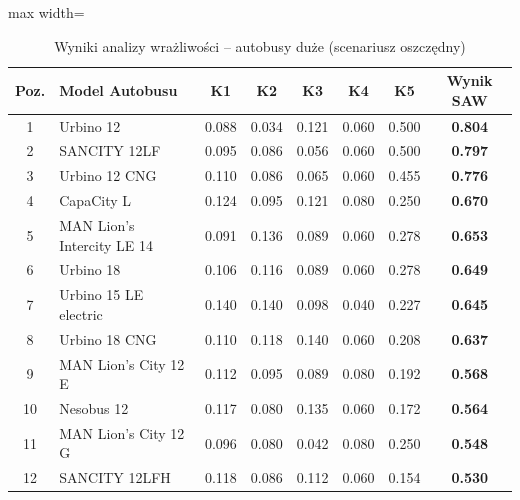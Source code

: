 \begin{table}[H]
    \centering
    \caption{Wyniki analizy wrażliwości -- autobusy duże (scenariusz oszczędny)}
    \vspace{0.2cm}
    \begin{adjustbox}{max width=\textwidth}
    \begin{tabular}{|c|l|c|c|c|c|c|c|}
        \hline
        \textbf{Poz.} & \textbf{Model Autobusu} & \textbf{K1} & \textbf{K2} & \textbf{K3} & \textbf{K4} & \textbf{K5} & \textbf{Wynik SAW} \\ \hline
        1 & Urbino 12              & 0.088 & 0.034 & 0.121 & 0.060 & 0.500 & \textbf{0.804} \\ \hline
        2 & SANCITY 12LF           & 0.095 & 0.086 & 0.056 & 0.060 & 0.500 & \textbf{0.797} \\ \hline
        3 & Urbino 12 CNG          & 0.110 & 0.086 & 0.065 & 0.060 & 0.455 & \textbf{0.776} \\ \hline
        4 & CapaCity L             & 0.124 & 0.095 & 0.121 & 0.080 & 0.250 & \textbf{0.670} \\ \hline
        5 & MAN Lion's Intercity LE 14 & 0.091 & 0.136 & 0.089 & 0.060 & 0.278 & \textbf{0.653} \\ \hline
        6 & Urbino 18              & 0.106 & 0.116 & 0.089 & 0.060 & 0.278 & \textbf{0.649} \\ \hline
        7 & Urbino 15 LE electric  & 0.140 & 0.140 & 0.098 & 0.040 & 0.227 & \textbf{0.645} \\ \hline
        8 & Urbino 18 CNG          & 0.110 & 0.118 & 0.140 & 0.060 & 0.208 & \textbf{0.637} \\ \hline
        9 & MAN Lion's City 12 E   & 0.112 & 0.095 & 0.089 & 0.080 & 0.192 & \textbf{0.568} \\ \hline
        10 & Nesobus 12            & 0.117 & 0.080 & 0.135 & 0.060 & 0.172 & \textbf{0.564} \\ \hline
        11 & MAN Lion's City 12 G  & 0.096 & 0.080 & 0.042 & 0.080 & 0.250 & \textbf{0.548} \\ \hline
        12 & SANCITY 12LFH         & 0.118 & 0.086 & 0.112 & 0.060 & 0.154 & \textbf{0.530} \\ \hline
    \end{tabular}
    \end{adjustbox}
\end{table}

